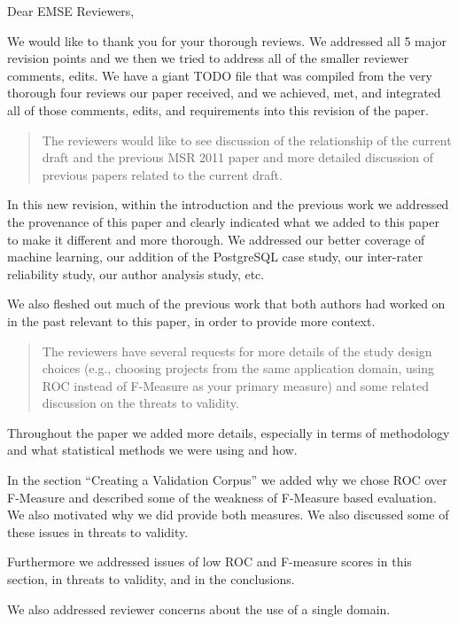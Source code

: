\documentclass{article}
\begin{document}
Dear EMSE Reviewers,

We would like to thank you for your thorough reviews. We addressed all
5 major revision points and we then we tried to address all of the
smaller reviewer comments, edits. We have a giant TODO file that was
compiled from the very thorough four reviews our paper received, and
we achieved, met, and integrated all of those comments, edits, and
requirements into this revision of the paper.

\begin{quotation}
 The reviewers would like to see discussion of the relationship of
 the current draft and the previous MSR 2011 paper and more detailed
 discussion of previous papers related to the current draft. 
\end{quotation}

In this new revision, within the introduction and the previous work we
addressed the provenance of this paper and clearly indicated what we
added to this paper to make it different and more thorough. We
addressed our better coverage of machine learning, our addition of the
PostgreSQL case study, our inter-rater reliability study, our author
analysis study, etc. 

We also fleshed out much of the previous work that both authors had
worked on in the past relevant to this paper, in order to provide more
context.

\begin{quotation}
     The reviewers have several requests for more details of the study
   design choices (e.g., choosing projects from the same application
   domain, using ROC instead of F-Measure as your primary measure) and
   some related discussion on the threats to validity.
\end{quotation}

Throughout the paper we added more details, especially in terms of
methodology and what statistical methods we were using and how.

In the section ``Creating a Validation Corpus'' we added why we chose
ROC over F-Measure and described some of the weakness of F-Measure
based evaluation. We also motivated why we did provide both
measures. We also discussed some of these issues in threats to
validity.

Furthermore we addressed issues of low ROC and F-measure scores in
this section, in threats to validity, and in the conclusions.

We also addressed reviewer concerns about the use of a single domain.
\end{document}
